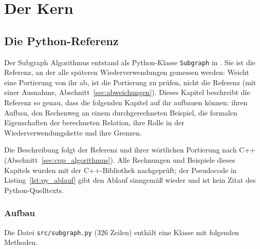 
\part{Der Kern}

\chapter{Die Python-Referenz}
\label{chap:python_referenz}

Der Subgraph Algorithmus entstand als Python-Klasse \texttt{Subgraph} in . Sie ist die Referenz, an der alle späteren Wiederverwendungen gemessen werden: Weicht eine Portierung von ihr ab, ist die Portierung zu prüfen, nicht die Referenz (mit einer Ausnahme, Abschnitt~\ref{sec:abweichungen}). Dieses Kapitel beschreibt die Referenz so genau, dass die folgenden Kapitel auf ihr aufbauen können: ihren Aufbau, den Rechenweg an einem durchgerechneten Beispiel, die formalen Eigenschaften der berechneten Relation, ihre Rolle in der Wiederverwendungskette und ihre Grenzen.

Die Beschreibung folgt der Referenz und ihrer wörtlichen Portierung nach C++ (Abschnitt~\ref{sec:cpp_algorithmus}). Alle Rechnungen und Beispiele dieses Kapitels wurden mit der C++-Bibliothek nachgeprüft; der Pseudocode in Listing~\ref{lst:py_ablauf} gibt den Ablauf sinngemäß wieder und ist kein Zitat des Python-Quelltexts.

\section{Aufbau}
\label{sec:py_aufbau}

Die Datei \texttt{src/subgraph.py} (326 Zeilen) enthält eine Klasse mit folgenden Methoden.

